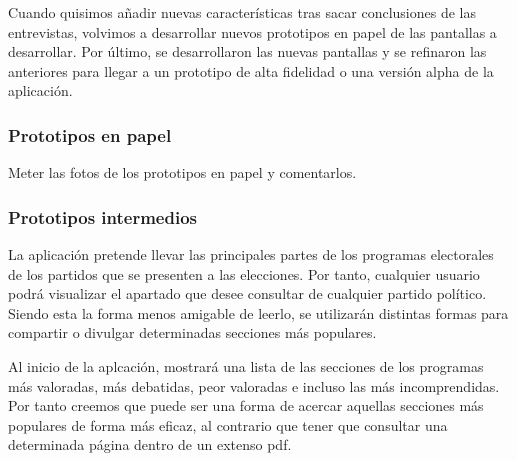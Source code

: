 Cuando quisimos añadir nuevas características tras sacar conclusiones de las entrevistas, volvimos a desarrollar nuevos prototipos en papel de las pantallas a desarrollar. Por último, se desarrollaron las nuevas pantallas y se refinaron las anteriores para llegar a un prototipo de alta fidelidad o una versión alpha de la aplicación.

\subsubsection{Prototipos en papel}

Meter las fotos de los prototipos en papel y comentarlos.

\subsubsection{Prototipos intermedios}

La aplicación pretende llevar las principales partes de los programas electorales de los partidos que se presenten a las elecciones. Por tanto, cualquier usuario podrá visualizar el apartado que desee consultar de cualquier partido político. Siendo esta la forma menos amigable de leerlo, se utilizarán distintas formas para compartir o divulgar determinadas secciones más populares.

Al inicio de la aplcación, mostrará una lista de las secciones de los programas más valoradas, más debatidas, peor valoradas e incluso las más incomprendidas. Por tanto creemos que puede ser una forma de acercar aquellas secciones más populares de forma más eficaz, al contrario que tener que consultar una determinada página dentro de un extenso pdf.

